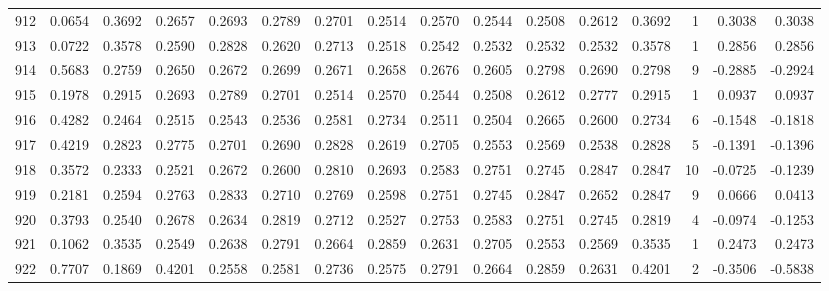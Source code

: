 \begin{tabular}{lrrrrrrrrrrrrrrr}
912 &      0.0654 &  0.3692 &  0.2657 &  0.2693 &  0.2789 &  0.2701 &  0.2514 &  0.2570 &  0.2544 &  0.2508 &   0.2612 &     0.3692 &      1 &                    0.3038 &                     0.3038 \\
913 &      0.0722 &  0.3578 &  0.2590 &  0.2828 &  0.2620 &  0.2713 &  0.2518 &  0.2542 &  0.2532 &  0.2532 &   0.2532 &     0.3578 &      1 &                    0.2856 &                     0.2856 \\
914 &      0.5683 &  0.2759 &  0.2650 &  0.2672 &  0.2699 &  0.2671 &  0.2658 &  0.2676 &  0.2605 &  0.2798 &   0.2690 &     0.2798 &      9 &                   -0.2885 &                    -0.2924 \\
915 &      0.1978 &  0.2915 &  0.2693 &  0.2789 &  0.2701 &  0.2514 &  0.2570 &  0.2544 &  0.2508 &  0.2612 &   0.2777 &     0.2915 &      1 &                    0.0937 &                     0.0937 \\
916 &      0.4282 &  0.2464 &  0.2515 &  0.2543 &  0.2536 &  0.2581 &  0.2734 &  0.2511 &  0.2504 &  0.2665 &   0.2600 &     0.2734 &      6 &                   -0.1548 &                    -0.1818 \\
917 &      0.4219 &  0.2823 &  0.2775 &  0.2701 &  0.2690 &  0.2828 &  0.2619 &  0.2705 &  0.2553 &  0.2569 &   0.2538 &     0.2828 &      5 &                   -0.1391 &                    -0.1396 \\
918 &      0.3572 &  0.2333 &  0.2521 &  0.2672 &  0.2600 &  0.2810 &  0.2693 &  0.2583 &  0.2751 &  0.2745 &   0.2847 &     0.2847 &     10 &                   -0.0725 &                    -0.1239 \\
919 &      0.2181 &  0.2594 &  0.2763 &  0.2833 &  0.2710 &  0.2769 &  0.2598 &  0.2751 &  0.2745 &  0.2847 &   0.2652 &     0.2847 &      9 &                    0.0666 &                     0.0413 \\
920 &      0.3793 &  0.2540 &  0.2678 &  0.2634 &  0.2819 &  0.2712 &  0.2527 &  0.2753 &  0.2583 &  0.2751 &   0.2745 &     0.2819 &      4 &                   -0.0974 &                    -0.1253 \\
921 &      0.1062 &  0.3535 &  0.2549 &  0.2638 &  0.2791 &  0.2664 &  0.2859 &  0.2631 &  0.2705 &  0.2553 &   0.2569 &     0.3535 &      1 &                    0.2473 &                     0.2473 \\
922 &      0.7707 &  0.1869 &  0.4201 &  0.2558 &  0.2581 &  0.2736 &  0.2575 &  0.2791 &  0.2664 &  0.2859 &   0.2631 &     0.4201 &      2 &                   -0.3506 &                    -0.5838 \\

\end{tabular}
